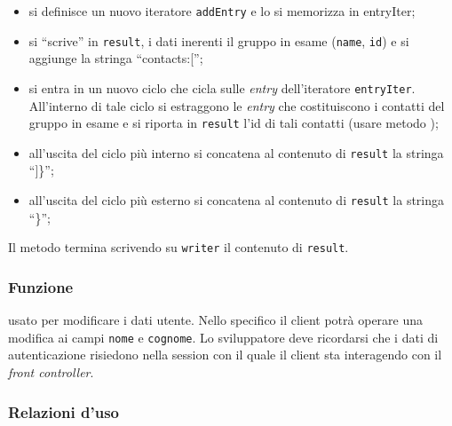 \begin{description}
\begin{itemize}
\begin{itemize}
\begin{itemize}
				\item si definisce un nuovo iteratore \texttt{addEntry}  e lo si memorizza in entryIter;
				\item si ``scrive'' in \texttt{result}, i dati inerenti il gruppo in esame (\texttt{name}, \texttt{id}) e si aggiunge la stringa ``contacts:['';
				\item si entra in un nuovo ciclo  che cicla sulle \textit{entry} dell'iteratore \texttt{entryIter}. All'interno di tale ciclo si estraggono le \textit{entry} che costituiscono i contatti del gruppo in esame e si riporta in \texttt{result} l'id di tali contatti (usare metodo );
				\item all'uscita del ciclo  più interno si concatena al contenuto di \texttt{result} la stringa ``]\}'';
				\item all'uscita del ciclo  più esterno si concatena al contenuto di \texttt{result} la stringa ``\}'';
			\end{itemize}
		\end{itemize}
	\end{itemize}
	Il metodo termina scrivendo su \texttt{writer} il contenuto di \texttt{result}.	
	
\end{description}


\subsubsection*{Funzione}
 usato per modificare i dati utente. Nello specifico il client potrà operare una modifica ai campi \texttt{nome} e \texttt{cognome}. Lo sviluppatore deve ricordarsi che i dati di autenticazione risiedono nella session con il quale il client sta interagendo con il \textit{front controller}.

\subsubsection*{Relazioni d'uso}

